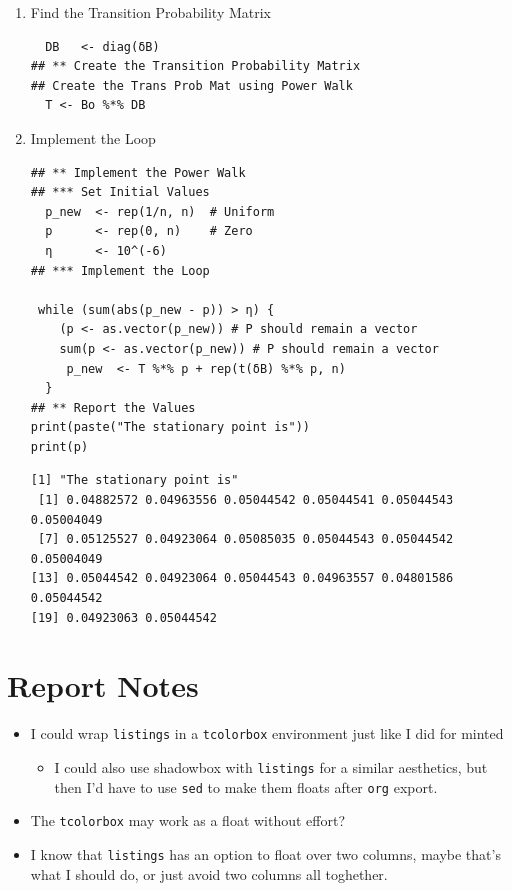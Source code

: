 \documentclass[11pt]{article}
\begin{document}
\begin{enumerate}
\begin{enumerate}
\begin{enumerate}
\item Find the Transition Probability Matrix
\label{sec:org7846dbb}
\lstset{language=r,label= ,caption= ,captionpos=b,numbers=none}
\begin{lstlisting}
  DB   <- diag(δB)
## ** Create the Transition Probability Matrix
## Create the Trans Prob Mat using Power Walk
  T <- Bo %*% DB
\end{lstlisting}

\item Implement the Loop
\label{sec:org941f11d}
\lstset{language=r,label= ,caption= ,captionpos=b,numbers=none}
\begin{lstlisting}
## ** Implement the Power Walk
## *** Set Initial Values
  p_new  <- rep(1/n, n)  # Uniform
  p      <- rep(0, n)    # Zero
  η      <- 10^(-6)
## *** Implement the Loop

 while (sum(abs(p_new - p)) > η) {
    (p <- as.vector(p_new)) # P should remain a vector
    sum(p <- as.vector(p_new)) # P should remain a vector
     p_new  <- T %*% p + rep(t(δB) %*% p, n)
  }
## ** Report the Values
print(paste("The stationary point is"))
print(p)
\end{lstlisting}

\begin{verbatim}
[1] "The stationary point is"
 [1] 0.04882572 0.04963556 0.05044542 0.05044541 0.05044543 0.05004049
 [7] 0.05125527 0.04923064 0.05085035 0.05044543 0.05044542 0.05004049
[13] 0.05044542 0.04923064 0.05044543 0.04963557 0.04801586 0.05044542
[19] 0.04923063 0.05044542
\end{verbatim}
\end{enumerate}
\end{enumerate}
\end{enumerate}
\section{Report Notes}
\label{sec:org33fd5d1}
\begin{itemize}
\item I could wrap \texttt{listings} in a \texttt{tcolorbox} environment just like I did for minted
\begin{itemize}
\item I could also use shadowbox with \texttt{listings} for a similar aesthetics, but
then I'd have to use \texttt{sed} to make them floats after \texttt{org} export.
\end{itemize}
\item The \texttt{tcolorbox} may work as a float without effort?
\item I know that \texttt{listings} has an option to float over two columns, maybe that's what I should do, or just avoid two columns all toghether.
\end{itemize}
\end{document}

